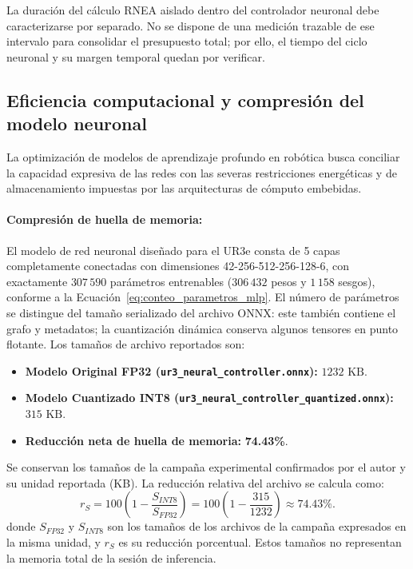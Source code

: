\documentclass[12pt]{article}
\begin{document}
La duración del cálculo RNEA aislado dentro del controlador neuronal debe caracterizarse por separado. No se dispone de una medición trazable de ese intervalo para consolidar el presupuesto total; por ello, el tiempo del ciclo neuronal y su margen temporal quedan por verificar.

\subsection{Eficiencia computacional y compresión del modelo neuronal}
\label{sec:eficiencia_computacional}

La optimización de modelos de aprendizaje profundo en robótica busca conciliar la capacidad expresiva de las redes con las severas restricciones energéticas y de almacenamiento impuestas por las arquitecturas de cómputo embebidas. 

\paragraph*{Compresión de huella de memoria:}
El modelo de red neuronal diseñado para el UR3e consta de 5 capas completamente conectadas con dimensiones 42-256-512-256-128-6, con exactamente $307\,590$ parámetros entrenables ($306\,432$ pesos y $1\,158$ sesgos), conforme a la Ecuación~\eqref{eq:conteo_parametros_mlp}. El número de parámetros se distingue del tamaño serializado del archivo ONNX: este también contiene el grafo y metadatos; la cuantización dinámica conserva algunos tensores en punto flotante. Los tamaños de archivo reportados son:
\begin{itemize}
    \item \textbf{Modelo Original FP32 (\texttt{ur3\_neural\_controller.onnx}):} $1232\text{ KB}$.
    \item \textbf{Modelo Cuantizado INT8 (\texttt{ur3\_neural\_controller\_quantized.onnx}):} $315\text{ KB}$.
    \item \textbf{Reducción neta de huella de memoria:} \textbf{74.43\%}.
\end{itemize}

Se conservan los tamaños de la campaña experimental confirmados por el autor y su unidad reportada (KB). La reducción relativa del archivo se calcula como:
\begin{equation}
    r_S=100\left(1-\frac{S_{INT8}}{S_{FP32}}\right)
    =100\left(1-\frac{315}{1232}\right)\approx74.43\%.
    \label{eq:reduccion_archivo_onnx}
\end{equation}
donde $S_{FP32}$ y $S_{INT8}$ son los tamaños de los archivos de la campaña expresados en la misma unidad, y $r_S$ es su reducción porcentual. Estos tamaños no representan la memoria total de la sesión de inferencia.
\end{document}
